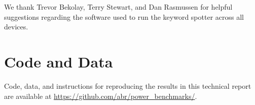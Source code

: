 \documentclass[sigconf, screen]{acmart}
\begin{document}
\begin{acks}
We thank Trevor Bekolay, Terry Stewart, and Dan Rasmussen for helpful suggestions regarding the software used to run the keyword spotter across all devices.
\end{acks}

\section*{Code and Data} 
 
Code, data, and instructions for reproducing the results in this technical report are available at \url{https://github.com/abr/power\_benchmarks/}.
%


\end{document}

